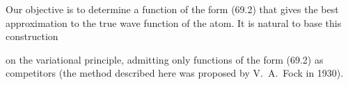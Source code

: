 Our objective is to determine a function of the form (69.2) that gives the best approximation to the true wave function of the atom. It is natural to base this construction

on the variational principle, admitting only functions of the form (69.2) as competitors (the method described here was proposed by V.~A.~Fock in 1930).
